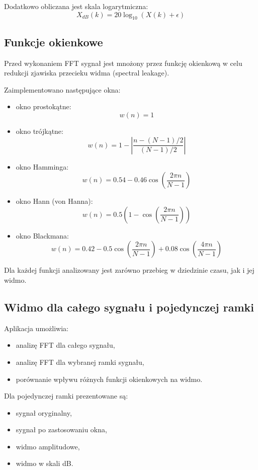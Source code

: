 \documentclass[a4paper,12pt]{article}
\begin{document}
Dodatkowo obliczana jest skala logarytmiczna:
\[
X_{dB}(k) = 20 \log_{10}(X(k) + \epsilon)
\]

\subsection{Funkcje okienkowe}

Przed wykonaniem FFT sygnał jest mnożony przez funkcję okienkową w celu redukcji zjawiska przecieku widma (spectral leakage).

Zaimplementowano następujące okna:

\begin{itemize}
	\item okno prostokątne:
	\[
	w(n) = 1
	\]
	
	\item okno trójkątne:
	\[
	w(n) = 1 - \left| \frac{n - (N-1)/2}{(N-1)/2} \right|
	\]
	
	\item okno Hamminga:
	\[
	w(n) = 0.54 - 0.46 \cos\left(\frac{2\pi n}{N-1}\right)
	\]
	
	\item okno Hann (von Hanna):
	\[
	w(n) = 0.5 \left(1 - \cos\left(\frac{2\pi n}{N-1}\right)\right)
	\]
	
	\item okno Blackmana:
	\[
	w(n) = 0.42 - 0.5 \cos\left(\frac{2\pi n}{N-1}\right) + 0.08 \cos\left(\frac{4\pi n}{N-1}\right)
	\]
	
\end{itemize}

Dla każdej funkcji analizowany jest zarówno przebieg w dziedzinie czasu, jak i jej widmo.

\subsection{Widmo dla całego sygnału i pojedynczej ramki}

Aplikacja umożliwia:

\begin{itemize}
	\item analizę FFT dla całego sygnału,
	\item analizę FFT dla wybranej ramki sygnału,
	\item porównanie wpływu różnych funkcji okienkowych na widmo.
\end{itemize}

Dla pojedynczej ramki prezentowane są:
\begin{itemize}
	\item sygnał oryginalny,
	\item sygnał po zastosowaniu okna,
	\item widmo amplitudowe,
	\item widmo w skali dB.
\end{itemize}
\end{document}

